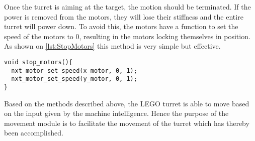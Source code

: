 Once the turret is aiming at the target, the motion should be terminated.
If the power is removed from the motors, they will lose their stiffness and the entire turret will power down.
To avoid this, the motors have a function to set the speed of the motors to $0$, resulting in the motors locking themselves in position.
As shown on \autoref{lst:StopMotors} this method is very simple but effective.
\begin{lstlisting}[language=CSharp,label={lst:StopMotors},caption={stop\_motors method from movement.c}]
void stop_motors(){
  nxt_motor_set_speed(x_motor, 0, 1);
  nxt_motor_set_speed(y_motor, 0, 1);
}
\end{lstlisting}

Based on the methods described above, the LEGO turret is able to move based on the input given by the machine intelligence.
Hence the purpose of the movement module is to facilitate the movement of the turret which has thereby been accomplished.
